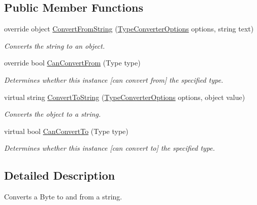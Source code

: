 \subsection*{Public Member Functions}
\begin{DoxyCompactItemize}
\item 
override object \hyperlink{a00026_a6176d20d761abfc0af4e840553ffae47}{Convert\-From\-String} (\hyperlink{a00154}{Type\-Converter\-Options} options, string text)
\begin{DoxyCompactList}\small\item\em Converts the string to an object. \end{DoxyCompactList}\item 
override bool \hyperlink{a00026_a74a66b405f6c18e69b9fd23a1dea91b0}{Can\-Convert\-From} (Type type)
\begin{DoxyCompactList}\small\item\em Determines whether this instance \mbox{[}can convert from\mbox{]} the specified type. \end{DoxyCompactList}\item 
virtual string \hyperlink{a00068_a36cb2f9b24f15a671293f3a722324c27}{Convert\-To\-String} (\hyperlink{a00154}{Type\-Converter\-Options} options, object value)
\begin{DoxyCompactList}\small\item\em Converts the object to a string. \end{DoxyCompactList}\item 
virtual bool \hyperlink{a00068_acb65bd8c8199d88d5b1629ae35d18514}{Can\-Convert\-To} (Type type)
\begin{DoxyCompactList}\small\item\em Determines whether this instance \mbox{[}can convert to\mbox{]} the specified type. \end{DoxyCompactList}\end{DoxyCompactItemize}


\subsection{Detailed Description}
Converts a Byte to and from a string. 



